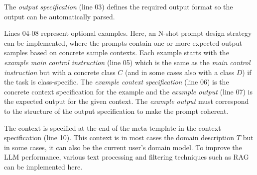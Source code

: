 The \textit{output specification} (line 03) defines the required output format so the output can be automatically parsed.

Lines 04-08 represent optional examples. Here, an N-shot prompt design strategy can be implemented, where the prompts contain one or more expected output samples based on concrete sample contexts. Each example starts with the \textit{example main control instruction} (line 05) which is the same as the \textit{main control instruction} but with a concrete class $C$ (and in some cases also with a class $D$) if the task is class-specific. The \textit{example context specification} (line 06) is the concrete context specification for the example and the \textit{example output} (line 07) is the expected output for the given context. The \textit{example output} must correspond to the structure of the output specification to make the prompt coherent.

The context is specified at the end of the meta-template in the context specification (line 10). This context is in most cases the domain description $T$ but in some cases, it can also be the current user's domain model. To improve the LLM performance, various text processing and filtering techniques such as RAG can be implemented here.